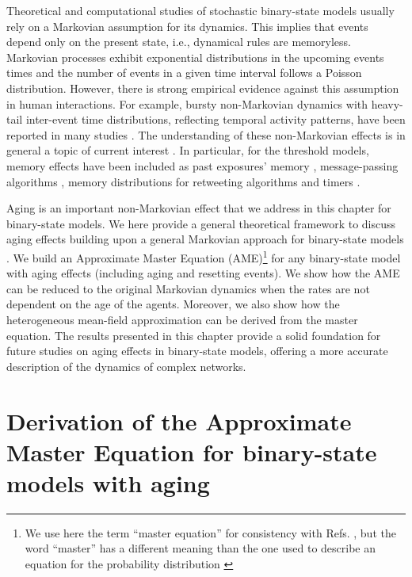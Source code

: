 Theoretical and computational studies of stochastic binary-state models usually rely on a Markovian assumption for its dynamics. This implies that events depend only on the present state, i.e., dynamical rules are memoryless. Markovian processes exhibit exponential distributions in the upcoming events times and the number of events in a given time interval follows a Poisson distribution. However, there is strong empirical evidence against this assumption in human interactions.  For example, bursty non-Markovian dynamics with heavy-tail inter-event time distributions, reflecting temporal activity patterns,  have been reported in many studies \cite{iribarren-2009,karsai-2011,rybski-2012,zignani-2016,artime-2017,kumar-2020}. The understanding of these non-Markovian effects is in general a topic of current interest \cite{van-mieghem-2013,starnini-2017,peralta-2020C,peralta-2020A}. In particular, for the threshold models, memory effects have been included as past exposures' memory \cite{dodds-2004}, message-passing algorithms \cite{shrestha-2014}, memory distributions for retweeting algorithms \cite{gleeson-2016} and timers \cite{oh-2018}.

Aging is an important non-Markovian effect that we address in this chapter for binary-state models. We here provide a general theoretical framework to discuss aging effects building upon a general Markovian approach for binary-state models \cite{gleeson-2011,gleeson-2013}. We build an Approximate Master Equation (AME)\footnote{\sffamily\small We use here the term  ``master equation'' for consistency with  Refs. \cite{gleeson-2011,gleeson-2013}, but the word ``master'' has a different meaning than the one used to describe an equation for the probability distribution \cite{toral2014stochastic, peralta-2020B}} for any binary-state model with aging effects (including aging and resetting events). We show how the AME can be reduced to the original Markovian dynamics when the rates are not dependent on the age of the agents. Moreover, we also show how the heterogeneous mean-field approximation can be derived from the master equation. The results presented in this chapter provide a solid foundation for future studies on aging effects in binary-state models, offering a more accurate description of the dynamics of complex networks. 

\section{Derivation of the Approximate Master Equation for binary-state models with aging \label{sec:Derivation of the Approximate Master Equation for binary-state models with aging}}
    
